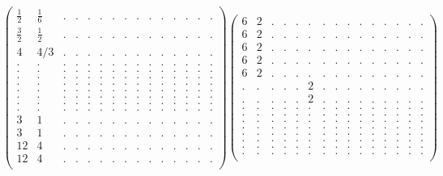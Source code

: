 \documentclass[12pt,a4paper]{amsart}
\begin{document}
\begin{align*}
\left(\begin{array}{rrrrrrrrrrrrrrr}%
\frac12&\frac{1}{6}&.&.&.&.&.&.&.&.&.&.&.&.&.\\%
\frac32&\frac12&.&.&.&.&.&.&.&.&.&.&.&.&.\\%
4&4/3&.&.&.&.&.&.&.&.&.&.&.&.&.\\%
.&.&.&.&.&.&.&.&.&.&.&.&.&.&.\\%
.&.&.&.&.&.&.&.&.&.&.&.&.&.&.\\%
.&.&.&.&.&.&.&.&.&.&.&.&.&.&.\\%
.&.&.&.&.&.&.&.&.&.&.&.&.&.&.\\%
.&.&.&.&.&.&.&.&.&.&.&.&.&.&.\\%
.&.&.&.&.&.&.&.&.&.&.&.&.&.&.\\%
.&.&.&.&.&.&.&.&.&.&.&.&.&.&.\\%
.&.&.&.&.&.&.&.&.&.&.&.&.&.&.\\%
3&1&.&.&.&.&.&.&.&.&.&.&.&.&.\\%
3&1&.&.&.&.&.&.&.&.&.&.&.&.&.\\%
12&4&.&.&.&.&.&.&.&.&.&.&.&.&.\\%
12&4&.&.&.&.&.&.&.&.&.&.&.&.&.\\%
\end{array}\right)%
\left(\begin{array}{rrrrrrrrrrrrrrr}%
6&2&.&.&.&.&.&.&.&.&.&.&.&.&.\\%
6&2&.&.&.&.&.&.&.&.&.&.&.&.&.\\%
6&2&.&.&.&.&.&.&.&.&.&.&.&.&.\\%
6&2&.&.&.&.&.&.&.&.&.&.&.&.&.\\%
6&2&.&.&.&.&.&.&.&.&.&.&.&.&.\\%
.&.&.&.&.&2&.&.&.&.&.&.&.&.&.\\%
.&.&.&.&.&2&.&.&.&.&.&.&.&.&.\\%
.&.&.&.&.&.&.&.&.&.&.&.&.&.&.\\%
.&.&.&.&.&.&.&.&.&.&.&.&.&.&.\\%
.&.&.&.&.&.&.&.&.&.&.&.&.&.&.\\%
.&.&.&.&.&.&.&.&.&.&.&.&.&.&.\\%
.&.&.&.&.&.&.&.&.&.&.&.&.&.&.\\%
.&.&.&.&.&.&.&.&.&.&.&.&.&.&.\\%
.&.&.&.&.&.&.&.&.&.&.&.&.&.&.\\%
.&.&.&.&.&.&.&.&.&.&.&.&.&.&.\\%
\end{array}\right)%
\end{align*}
\end{document}
